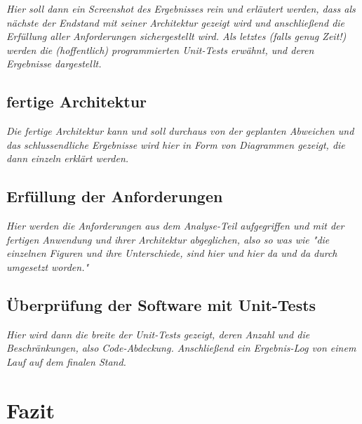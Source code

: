 \emph{Hier soll dann ein Screenshot des Ergebnisses rein und erläutert werden, dass als nächste der Endstand mit seiner Architektur gezeigt wird und anschließend die Erfüllung aller Anforderungen sichergestellt wird. Als letztes (falls genug Zeit!) werden die (hoffentlich) programmierten Unit-Tests erwähnt, und deren Ergebnisse dargestellt.}

\subsection{fertige Architektur}
\label{subsec:f_architektur}

\emph{Die fertige Architektur kann und soll durchaus von der geplanten Abweichen und das schlussendliche Ergebnisse wird hier in Form von Diagrammen gezeigt, die dann einzeln erklärt werden.}

\subsection{Erfüllung der Anforderungen}
\label{subsec:erfullung_anforderungen}

\emph{Hier werden die Anforderungen aus dem Analyse-Teil aufgegriffen und mit der fertigen Anwendung und ihrer Architektur abgeglichen, also so was wie "die einzelnen Figuren und ihre Unterschiede, sind hier und hier da und da durch umgesetzt worden."}

\subsection{Überprüfung der Software mit Unit-Tests}
\label{subsec:unittests}

\emph{Hier wird dann die breite der Unit-Tests gezeigt, deren Anzahl und die Beschränkungen, also Code-Abdeckung. Anschließend ein Ergebnis-Log von einem Lauf auf dem finalen Stand.}


\section{Fazit}
\label{sec:Fazit}